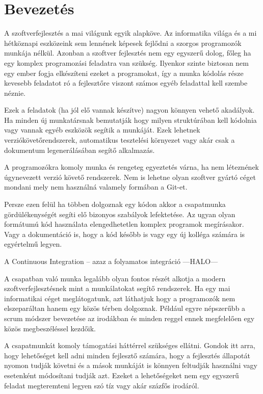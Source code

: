 \chapter{Bevezetés}
\label{chapIntroduction}

A szoftverfejlesztés a mai világunk egyik alapköve. 
Az informatika világa és a mi hétköznapi eszközeink sem lennének képesek fejlődni a szorgos programozók munkája nélkül. 
Azonban a szoftver fejlesztés nem egy egyszerű dolog, főleg ha egy komplex programozási feladatra van szükség. 
Ilyenkor szinte biztosan nem egy ember fogja elkészíteni ezeket a programokat, így a munka kódolás része kevesebb feladatot ró a fejlesztőre viszont számos egyéb feladattal kell szembe néznie.

Ezek a feladatok (ha jól elő vannak készítve) nagyon könnyen vehető akadályok. 
Ha minden új munkatársnak bemutatják hogy milyen struktúrában kell kódolnia vagy vannak egyéb eszközök segítik a munkáját.
Ezek lehetnek verziókövetőrendszerek, automatikus tesztelési környezet vagy akár csak a dokumentum legenerálásában segítő alkalmazás.

A programozókra komoly munka és rengeteg egyeztetés várna, ha nem léteznének úgynevezett verzió követő rendszerek.
Nem is lehetne olyan szoftver gyártó céget mondani mely nem használná valamely formában a Git-et.

Persze ezen felül ha többen dolgoznak egy kódon akkor a csapatmunka gördülékenységét segíti elő bizonyos szabályok lefektetése.
Az ugyan olyan formátumú kód használata elengedhetetlen komplex programok megírásakor.
Vagy a dokumentáció is, hogy a kód később is vagy egy új kolléga számára is egyértelmű legyen.

A Continuous Integration – azaz a folyamatos integráció
---HALO---

A csapatban való munka legalább olyan fontos részét alkotja a modern szoftverfejlesztésnek mint a munkálatokat segítő rendszerek.
Ha egy mai informatikai céget meglátogatunk, azt láthatjuk hogy a programozók nem elszeparáltan hanem egy közös térben dolgoznak.
Például egyre népszerűbb a scrum módszer bevezetése az irodákban és minden reggel ennek megfelelően egy közös megbeszéléssel kezdőik.

A csapatmunkát komoly támogatási háttérrel szükséges ellátni. 
Gondok itt arra, hogy lehetőséget kell adni minden fejlesztő számára, hogy a fejlesztés állapotát nyomon tudják követni és a mások munkáját is könnyen feltudják használni vagy esetenként módosítani tudják azt. 
Ezeket a lehetőségeket nem egy egyszerű feladat megteremteni legyen szó tíz vagy akár százfős irodáról.

